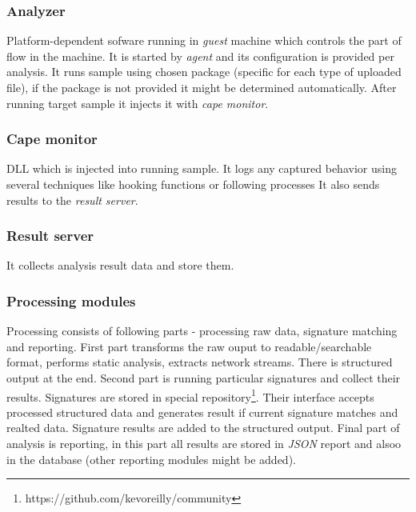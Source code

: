 \subsubsection*{Analyzer}
Platform-dependent sofware running in \emph{guest} machine which controls the part of flow in the machine. It is started by \emph{agent} and its configuration is provided per analysis. It runs sample using chosen package (specific for each type of uploaded file), if the package is not provided it might be determined automatically. After running target sample it injects it with \emph{cape monitor}.

\subsubsection*{Cape monitor}
DLL which is injected into running sample. It logs any captured behavior using several techniques like hooking functions or following processes It also sends results to the \emph{result server}.

\subsubsection*{Result server}
It collects analysis result data and store them.

\subsubsection*{Processing modules}
Processing consists of following parts - processing raw data, signature matching and reporting. First part transforms the raw ouput to readable/searchable format, performs static analysis, extracts network streams. There is structured output at the end. Second part is running particular signatures and collect their results. Signatures are stored in special repository\footnote{https://github.com/kevoreilly/community}. Their interface accepts processed structured data and generates result if current signature matches and realted data. Signature results are added to the structured output. Final part of analysis is reporting, in this part all results are stored in \emph{JSON} report and alsoo in the database (other reporting modules might be added).

